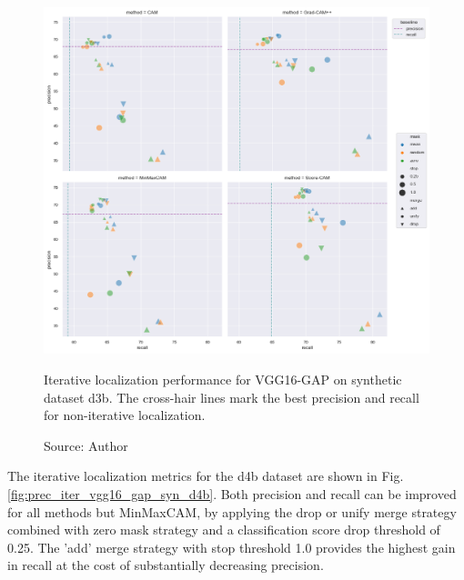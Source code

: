 \begin{figure}[ht]
    \begin{center}       
    \includegraphics[width=1.0\textwidth]{images/fig_iter_vgg16_gap_syn_d3b.png}
    \caption[Iterative localization performance for VGG16-GAP on synthetic dataset d3b]{Iterative localization performance for VGG16-GAP on synthetic dataset d3b. The cross-hair lines mark the best precision and recall for non-iterative localization.}
    \caption*{Source: Author}
    \label{fig:prec_iter_vgg16_gap_syn_d3b}
    \end{center}
\end{figure}

The iterative localization metrics for the d4b dataset are shown in Fig. \ref{fig:prec_iter_vgg16_gap_syn_d4b}. Both precision and recall can be improved for all methods but MinMaxCAM, by applying the drop or unify merge strategy combined with zero mask strategy and a classification score drop threshold of 0.25. The 'add' merge strategy with stop threshold 1.0 provides the highest gain in recall at the cost of substantially decreasing precision.

